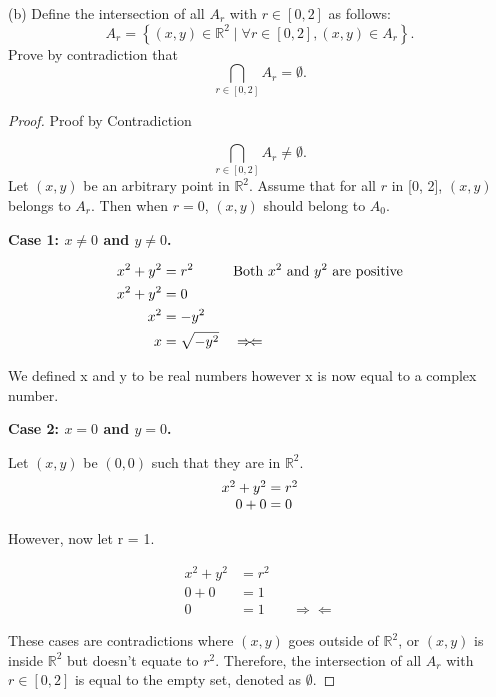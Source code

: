 \documentclass{article}
\begin{document}
(b) Define the intersection of all \( A_r \) with \( r \in [0, 2] \) as follows:
\[ A_r = \left\{(x, y) \in \mathbb{R}^2 \mid \forall r \in [0, 2], (x, y) \in A_r \right\}. \]
Prove by contradiction that
\[ \bigcap_{r \in [0,2]} A_r = \emptyset. \]
\vspace{2em}
\begin{proof} 
Proof by Contradiction

\vspace{1em}
\[ \bigcap_{r \in [0,2]} A_r \neq \emptyset. \]
Let \( (x, y) \) be an arbitrary point in \( \mathbb{R}^2 \). Assume that for all \( r \) in [0, 2], \( (x, y) \) belongs to \( A_r \). Then when \( r = 0 \), \( (x, y) \) should belong to \( A_0 \).

\vspace{1em}

\textbf{Case 1: \( x \neq 0 \) and \( y \neq 0 \).}


\begin{align*}
x^2 + y^2 &= r^2 &&\text{Both \( x^2 \) and \( y^2 \) are positive} \\
x^2 + y^2 &= 0 \\
x^2 &= -y^2 \\ 
x &= \sqrt{-y^2} &&\Rightarrow\!\Leftarrow  %
\end{align*}

We defined x and y to be real numbers however x is now equal to a complex number. 

\vspace{1em}
\textbf{Case 2: \( x = 0 \) and \( y = 0 \).}

Let \( (x, y) \) be \( (0, 0) \) such that they are in \( \mathbb{R}^2 \).
\begin{equation*}
\begin{gathered}
\begin{array}{r@{{}={}}l}
x^2 + y^2 & r^2 \\
0 + 0 & 0 \\ 
 
\end{array}
\end{gathered}
\end{equation*}

However, now let r = 1.

\begin{align*}
x^2 + y^2 &= r^2 \\
0 + 0 &= 1 \\
0 &= 1 &&\Rightarrow\!\Leftarrow
\end{align*}

\vspace{1em}

These cases are contradictions where \( (x, y) \) goes outside of \( \mathbb{R}^2 \), or \( (x, y) \) is inside \( \mathbb{R}^2 \) but doesn't equate to \( r^2 \). Therefore, the intersection of all \( A_r \) with \( r \in [0, 2] \) is equal to the empty set, denoted as \( \emptyset \).

\end{proof}
\vspace{1cm}  %
\end{document}

